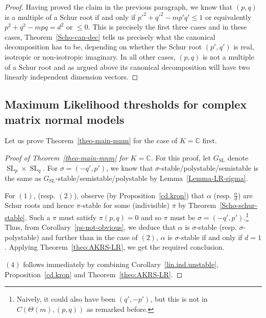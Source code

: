 \documentclass[11pt]{amsart}
\theoremstyle{definition}
\newcommand{\C}{{\mathbb C}}
\newcommand{\SL}{\operatorname{SL}}
\begin{document}
\begin{proof}

Having proved the claim in the previous paragraph, we know that $(p,q)$ is a multiple of a Schur root if and only if $p'^2 + q'^2 - mp'q' \leq 1$ or equivalently $p^2 + q^2 - mpq = d^2$ or $\leq 0$. This is precisely the first three cases and in these cases, Theorem~\ref{Scho-can-dec} tells us precisely what the canonical decomposition has to be, depending on whether the Schur root $(p',q')$ is real, isotropic or non-isotropic imaginary. In all other cases, $(p,q)$ is not a multiple of a Schur root and as argued above its canonical decomposition will have two linearly independent dimension vectors.
\end{proof}





\subsection{Maximum Likelihood thresholds for complex matrix normal models}
Let us prove Theorem~\ref{theo-main-mnm} for the case of $K= \C$ first.


\begin{proof} [Proof of Theorem~\ref{theo-main-mnm} for $K = \C$]
For this proof, let $G_{\SL}$ denote $\SL_p \times \SL_q$. For $\sigma = (-q',p')$, we know that $\sigma$-stable/polystable/semistable is the same as $G_{\SL}$-stable/semistable/polystable by Lemma~\ref{Lemma-LR-sigma}.


For $(1)$, (resp. $(2)$), observe (by Proposition~\ref{cd.kron}) that $\alpha$ (resp. $\frac{\alpha}{d}$) are Schur roots and hence $\pi$-stable for some (indivisible) $\pi$ by Theorem~\ref{Scho-schur-stable}. Such a $\pi$ must satisfy $\pi(p,q) = 0$ and so $\pi$ must be $\sigma = (-q',p')$.\footnote{Naively, it could also have been $(q',-p')$, but this is not in $C(\Theta(m),(p,q))$ as remarked before.} Thus, from Corollary~\ref{ps-not-obvious}, we deduce that $\alpha$ is $\sigma$-stable (resp. $\sigma$-polystable) and further than in the case of $(2)$, $\alpha$ is $\sigma$-stable if and only if $d = 1$. Applying Theorem~\ref{theo:AKRS-LR}, we get the required conclusion.

 $(4)$ follows immediately by combining Corollary~\ref{lin.ind.unstable}, Proposition~\ref{cd.kron} and Theorem~\ref{theo:AKRS-LR}.
\end{proof}
\end{document}
